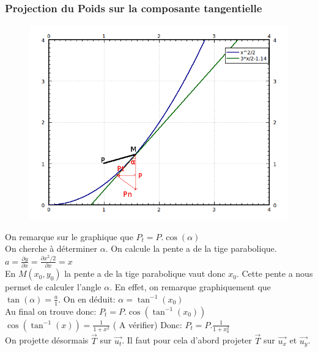 \documentclass[10pt,a4paper]{article}
\begin{document}
\subsubsection{Projection du Poids sur la composante tangentielle}
\begin{figure}[H]
	\includegraphics[scale=0.7]{GraphMathZoomProjectionPoids.png}
\end{figure}

On remarque sur le graphique que $P_t=P.\cos(\alpha)$\\
On cherche à déterminer $\alpha$.
On calcule la pente a de la tige parabolique. $a=\frac{\partial y}{\partial x}=\frac{\partial x^2/2}{\partial x}=x$ \\
En $M(x_0,y_0)$ la pente a de la tige parabolique vaut donc $x_0$.
Cette pente a nous permet de calculer l'angle $\alpha$. En effet, on remarque graphiquement que $\tan(\alpha)=\frac{a}{1}$. On en déduit: $\alpha=\tan^{-1}(x_0)$\\
Au final on trouve donc: $P_t=P.\cos(\tan^{-1}(x_0)) $\\
$\cos(\tan^{-1}(x))=\frac{1}{1+x^2}$ ( A vérifier) Donc: $P_t=P.\frac{1}{1+x^2_0}$
\\
On projette désormais $\vec{T}$ sur $\vec{u_t}$. Il faut pour cela d'abord projeter $\vec{T}$ sur $\vec{u_x}$ et $\vec{u_y}$. \\
\end{document}

